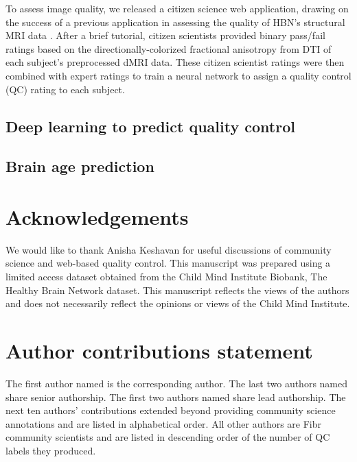 \documentclass[fleqn,10pt]{wlscirep}
\begin{document}
To assess image quality, we released a citizen science web application, drawing on the success of a previous application in assessing the quality of HBN's structural MRI data \cite{keshavan2019-er}. After a brief tutorial, citizen scientists provided binary pass/fail ratings based on the directionally-colorized fractional anisotropy from DTI of each subject's preprocessed dMRI data. These citizen scientist ratings were then combined with expert ratings to train a neural network to assign a quality control (QC) rating to each subject.

\subsection*{Deep learning to predict quality control}

\subsection*{Brain age prediction}



\section*{Acknowledgements}

We would like to thank Anisha Keshavan for useful discussions of community science and web-based quality control. This manuscript was prepared using a limited access dataset obtained from the Child Mind Institute Biobank, The Healthy Brain Network dataset. This manuscript reflects the views of the authors and does not necessarily reflect the opinions or views of the Child Mind Institute.


\section*{Author contributions statement}

The first author named is the corresponding author.
The last two authors named share senior authorship.
The first two authors named share lead authorship.
The next ten authors' contributions extended beyond providing community science annotations and are listed in alphabetical order.
All other authors are Fibr community scientists and are listed in descending order of the number of QC labels they produced.

\end{document}
